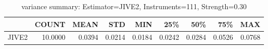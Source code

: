 \begin{table}[ht]
\centering
\caption{variance summary: Estimator=JIVE2, Instruments=111, Strength=0.30}
\begin{tabular}{lrrrrrrrr}
\toprule
 & COUNT & MEAN & STD & MIN & 25\% & 50\% & 75\% & MAX \\
\midrule
JIVE2 & 10.0000 & 0.0394 & 0.0214 & 0.0184 & 0.0242 & 0.0284 & 0.0526 & 0.0768 \\
\bottomrule
\end{tabular}
\end{table}
